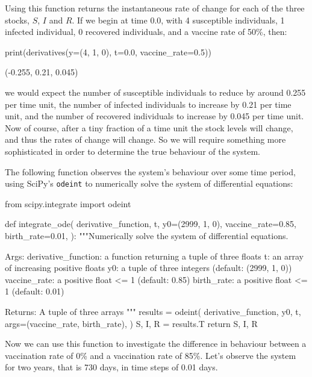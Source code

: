 Using this function returns the instantaneous rate of change for each of the
three stocks, $S$, $I$ and $R$. If we begin at time 0.0, with 4 susceptible
individuals, 1 infected individual, 0 recovered individuals, and a vaccine rate
of 50\%, then:

\begin{pyin}
print(derivatives(y=(4, 1, 0), t=0.0, vaccine_rate=0.5))
\end{pyin}

\begin{pyout}
(-0.255, 0.21, 0.045)
\end{pyout}

we would expect the number of susceptible individuals to reduce by around 0.255
per time unit, the number of infected individuals to increase by 0.21 per time
unit, and the number of recovered individuals to increase by 0.045 per time
unit. Now of course, after a tiny fraction of a time unit the stock levels will
change, and thus the rates of change will change. So we will require something
more sophisticated in order to determine the true behaviour of the system.

The following function observes the system's behaviour over some time period,
using SciPy's \texttt{odeint} to numerically solve the system of
differential equations:

\begin{pyin}
from scipy.integrate import odeint


def integrate_ode(
    derivative_function,
    t,
    y0=(2999, 1, 0),
    vaccine_rate=0.85,
    birth_rate=0.01,
):
    """Numerically solve the system of differential equations.

    Args:
        derivative_function: a function returning a tuple
                             of three floats
        t: an array of increasing positive floats
        y0: a tuple of three integers (default: (2999, 1, 0))
        vaccine_rate: a positive float <= 1 (default: 0.85)
        birth_rate: a positive float <= 1 (default: 0.01)

    Returns:
        A tuple of three arrays
    """
    results = odeint(
        derivative_function,
        y0,
        t,
        args=(vaccine_rate, birth_rate),
    )
    S, I, R = results.T
    return S, I, R
\end{pyin}

Now we can use this function to investigate the difference in behaviour between
a vaccination rate of 0\% and a vaccination rate of 85\%. Let's observe the
system for two years, that is 730 days, in time steps of 0.01 days.

